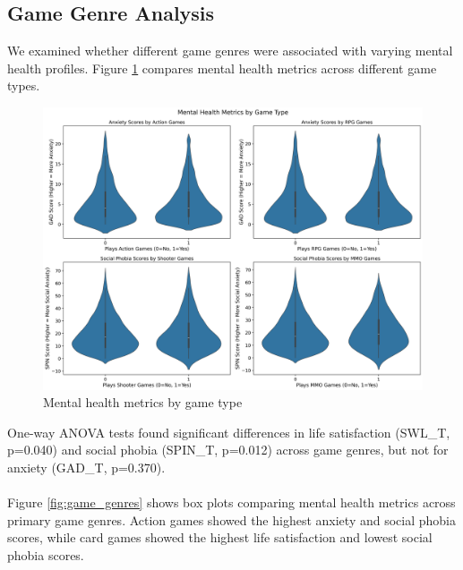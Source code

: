 \documentclass[12pt]{article}
\begin{document}
\subsection{Game Genre Analysis}

We examined whether different game genres were associated with varying mental health profiles. Figure \ref{fig:game_type} compares mental health metrics across different game types.

\begin{figure}[H]
\centering
\includegraphics[width=\textwidth]{mental_health_by_game_type.png}
\caption{Mental health metrics by game type}
\label{fig:game_type}
\end{figure}
\noindent
One-way ANOVA tests found significant differences in life satisfaction (SWL\_T, p=0.040) and social phobia (SPIN\_T, p=0.012) across game genres, but not for anxiety (GAD\_T, p=0.370). \\
\\
Figure \ref{fig:game_genres} shows box plots comparing mental health metrics across primary game genres. Action games showed the highest anxiety and social phobia scores, while card games showed the highest life satisfaction and lowest social phobia scores.
\end{document}
